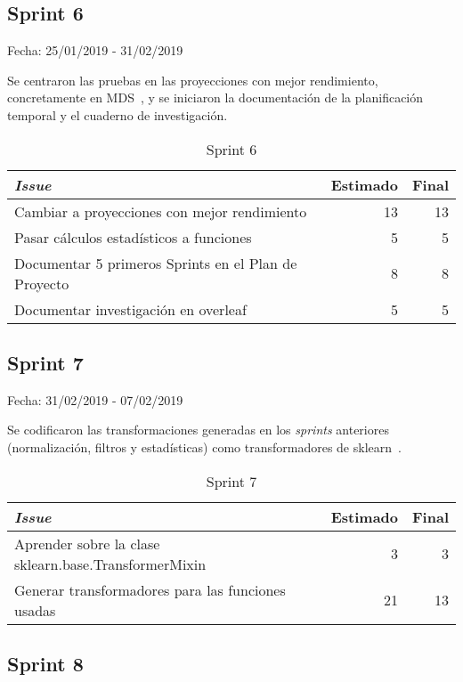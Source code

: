 \subsection{Sprint 6}

Fecha: 25/01/2019 - 31/02/2019

Se centraron las pruebas en las proyecciones con mejor rendimiento, concretamente en MDS~\cite{MDS}, y se iniciaron la documentación de la planificación temporal y el cuaderno de investigación. 

\begin{table}[H]
	\begin{tabularx}{\textwidth}{Xrr}
		\toprule \textbf{\textit{Issue}} & \textbf{Estimado} & \textbf{Final}\\
		\toprule
		Cambiar a proyecciones con mejor rendimiento & 13 & 13 \\
		Pasar cálculos estadísticos a funciones & 5 & 5 \\
		Documentar 5 primeros Sprints en el Plan de Proyecto & 8 & 8 \\
		Documentar investigación en overleaf~\cite{overleaf} & 5 & 5 \\
		\bottomrule
	\end{tabularx}
	\caption{Sprint 6}
\end{table}

\subsection{Sprint 7}

Fecha: 31/02/2019 - 07/02/2019

Se codificaron las transformaciones generadas en los \textit{sprints} anteriores (normalización, filtros y estadísticas) como transformadores de sklearn~\cite{scikit-learn}.

\begin{table}[H]
	\begin{tabularx}{\textwidth}{Xrr}
		\toprule \textbf{\textit{Issue}} & \textbf{Estimado} & \textbf{Final}\\
		\toprule 
		Aprender sobre la clase sklearn.base.TransformerMixin~\cite{TransformerMixin} & 3 & 3 \\
		Generar transformadores para las funciones usadas & 21 & 13 \\
		\bottomrule
	\end{tabularx}
	\caption{Sprint 7}
\end{table}

\subsection{Sprint 8}

